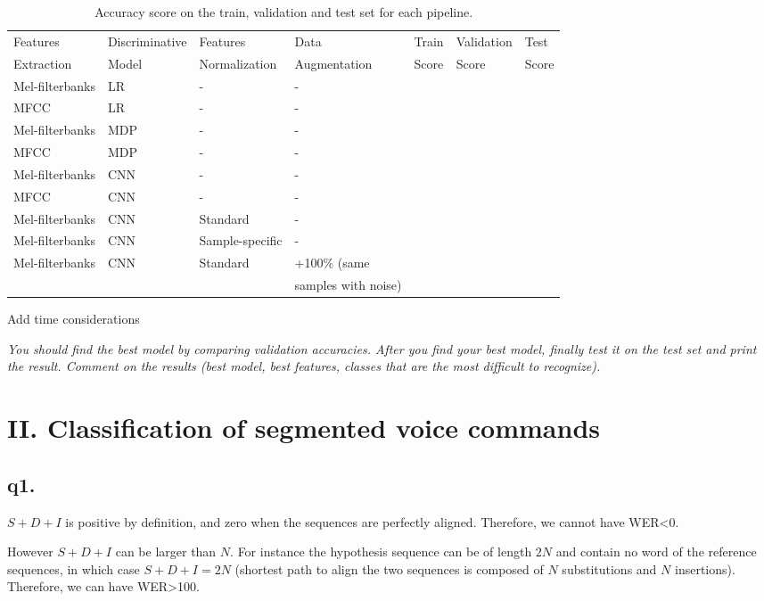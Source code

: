 \documentclass[11pt]{article}
\begin{document}
\begin{table}[h!]
\centering
  \begin{tabular}{|l|l|l|l|l|l|l|}  \hline
    Features  & Discriminative & Features  & Data &  Train  & Validation & Test \\     
   Extraction & Model & Normalization & Augmentation  &  Score & Score & Score \\  \hline    
    Mel-filterbanks & LR & - & - & & &  \\ \hline
    MFCC & LR & - & - & & &\\ \hline
    Mel-filterbanks & MDP & - & - & & & \\ \hline
    MFCC & MDP & - & - & & &\\ \hline
    Mel-filterbanks & CNN & - & - & & &\\ \hline
    MFCC & CNN & - & - & & &\\ \hline
    Mel-filterbanks & CNN & Standard & - & & &\\ \hline
    Mel-filterbanks & CNN & Sample-specific & - & & & \\ \hline
    Mel-filterbanks & CNN & Standard & +100\% (same  & & & \\ 
     &  & & samples with noise) & & & \\ \hline
  \end{tabular}
  \caption{Accuracy score on the train, validation and test set for each pipeline.}
\end{table}

Add time considerations


\textit{You should find the best model by comparing validation accuracies. After you find your best model, finally test it on the test set and print the result. Comment on the results (best model, best features, classes that are the most difficult to recognize).
}
\section{II. Classification of segmented voice commands}

\subsection*{q1.}
$S+D+I$ is positive by definition, and zero when the sequences are perfectly aligned. Therefore, we cannot have WER<0.

However $S+D+I$ can be larger than $N$. For instance the hypothesis sequence can be of length $2N$ and contain no word of the reference sequences, in which case $S+D+I=2N$ (shortest path to align the two sequences is composed of $N$ substitutions and $N$ insertions).
Therefore, we can have WER>100.
\end{document}

